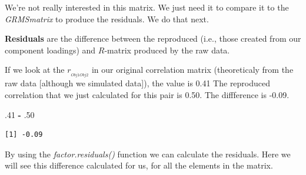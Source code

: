 \documentclass[
  english,
]{book}
\newenvironment{Shaded}{\begin{snugshade}}{\end{snugshade}}
\newcommand{\DecValTok}[1]{\textcolor[rgb]{0.00,0.00,0.81}{#1}}
\newcommand{\FloatTok}[1]{\textcolor[rgb]{0.00,0.00,0.81}{#1}}
\newcommand{\KeywordTok}[1]{\textcolor[rgb]{0.13,0.29,0.53}{\textbf{#1}}}
\newcommand{\NormalTok}[1]{#1}
\newcommand{\OperatorTok}[1]{\textcolor[rgb]{0.81,0.36,0.00}{\textbf{#1}}}
\newcommand{\StringTok}[1]{\textcolor[rgb]{0.31,0.60,0.02}{#1}}
\begin{document}
We're not really interested in this matrix. We just need it to compare it to the \emph{GRMSmatrix} to produce the residuals. We do that next.

\textbf{Residuals} are the difference between the reproduced (i.e., those created from our component loadings) and \(R\)-matrix produced by the raw data.

If we look at the \(r_{_{Obj1Obj2}}\) in our original correlation matrix (theoreticaly from the raw data {[}although we simulated data{]}), the value is 0.41 The reproduced correlation that we just calculated for this pair is 0.50. The diffference is -0.09.

\begin{Shaded}
\begin{Highlighting}[]
\FloatTok{.41} \OperatorTok{-}\StringTok{ }\FloatTok{.50}
\end{Highlighting}
\end{Shaded}

\begin{verbatim}
[1] -0.09
\end{verbatim}

By using the \emph{factor.residuals()} function we can calculate the residuals. Here we will see this difference calculated for us, for all the elements in the matrix.

\begin{Shaded}
\end{Shaded}
\end{document}
